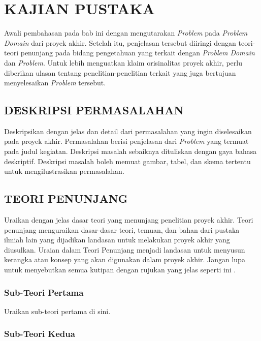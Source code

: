 \chapter{KAJIAN PUSTAKA}

Awali pembahasan pada bab ini dengan mengutarakan \textit{Problem} pada
\textit{Problem Domain} dari proyek akhir. Setelah itu, penjelasan tersebut diiringi
dengan teori-teori penunjang pada bidang pengetahuan yang terkait dengan
\textit{Problem Domain} dan \textit{Problem}. Untuk lebih menguatkan klaim orisinalitas
proyek akhir, perlu diberikan ulasan tentang penelitian-penelitian terkait yang juga
bertujuan menyelesaikan \textit{Problem} tersebut.

\section{DESKRIPSI PERMASALAHAN}

Deskripsikan dengan jelas dan detail dari permasalahan yang ingin diselesaikan pada
proyek akhir. Permasalahan berisi penjelasan dari \textit{Problem} yang termuat pada
judul kegiatan. Deskripsi masalah sebaiknya dituliskan dengan gaya bahasa deskriptif.
Deskripsi masalah boleh memuat gambar, tabel, dan skema tertentu untuk mengilustrasikan
permasalahan.

\section{TEORI PENUNJANG}

Uraikan dengan jelas dasar teori yang menunjang penelitian proyek akhir. Teori penunjang
menguraikan dasar-dasar teori, temuan, dan bahan dari pustaka ilmiah lain yang dijadikan
landasan untuk melakukan proyek akhir yang diusulkan. Uraian dalam Teori Penunjang
menjadi landasan untuk menyusun kerangka atau konsep yang akan digunakan dalam proyek
akhir. Jangan lupa untuk menyebutkan semua kutipan dengan rujukan yang jelas seperti
ini \cite{buku_contoh}.

\subsection{Sub-Teori Pertama}

Uraikan sub-teori pertama di sini.

\subsection{Sub-Teori Kedua}

